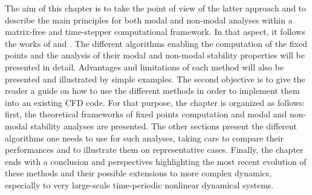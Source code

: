 The aim of this chapter is to take the point of view of the latter approach and to describe the main principles for both modal and non-modal analyses within a matrix-free and time-stepper computational framework. In that aspect, it follows the works of \cite{tuckerman2000bifurcation} and \cite{dijkstra2014numerical}. The different algorithms enabling the computation of the fixed points and the analysis of their modal and non-modal stability properties will be presented in detail. Advantages and limitations of each method will also be presented and illustrated by simple examples. The second objective is to give the reader a guide on how to use the different methods in order to implement them into an existing CFD code. For that purpose, the chapter is organized as follows: first, the theoretical frameworks of fixed points computation and modal and non-modal stability analyses are presented. The other sections present the different algorithms one needs to use for such analyses, taking care to compare their performances and to illustrate them on representative cases. Finally, the chapter ends with a conclusion and perspectives highlighting the most recent evolution of these methods and their possible extensions to more complex dynamics, especially to very large-scale time-periodic nonlinear dynamical systems.
